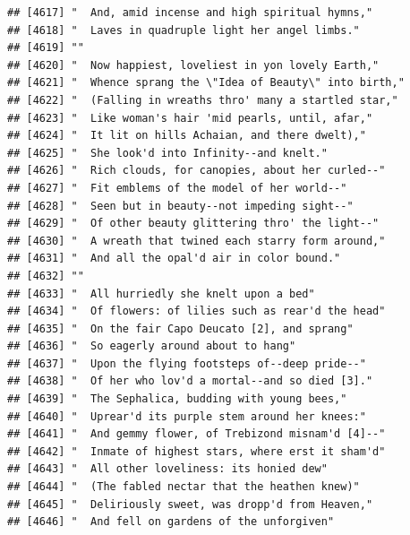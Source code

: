 \documentclass{article}\usepackage[]{graphicx}\usepackage[]{color}
\makeatletter
\newenvironment{kframe}{%
 \def\at@end@of@kframe{}%
 \ifinner\ifhmode%
  \def\at@end@of@kframe{\end{minipage}}%
  \begin{minipage}{\columnwidth}%
 \fi\fi%
 \def\FrameCommand##1{\hskip\@totalleftmargin \hskip-\fboxsep
 \colorbox{shadecolor}{##1}\hskip-\fboxsep
     \hskip-\linewidth \hskip-\@totalleftmargin \hskip\columnwidth}%
 \MakeFramed {\advance\hsize-\width
   \@totalleftmargin\z@ \linewidth\hsize
   \@setminipage}}%
 {\par\unskip\endMakeFramed%
 \at@end@of@kframe}
\newenvironment{knitrout}{}{} %
\makeatother
\begin{document}
\begin{knitrout}
\begin{kframe}
\begin{verbatim}
## [4617] "  And, amid incense and high spiritual hymns,"                               
## [4618] "  Laves in quadruple light her angel limbs."                                 
## [4619] ""                                                                            
## [4620] "  Now happiest, loveliest in yon lovely Earth,"                              
## [4621] "  Whence sprang the \"Idea of Beauty\" into birth,"                          
## [4622] "  (Falling in wreaths thro' many a startled star,"                           
## [4623] "  Like woman's hair 'mid pearls, until, afar,"                               
## [4624] "  It lit on hills Achaian, and there dwelt),"                                
## [4625] "  She look'd into Infinity--and knelt."                                      
## [4626] "  Rich clouds, for canopies, about her curled--"                             
## [4627] "  Fit emblems of the model of her world--"                                   
## [4628] "  Seen but in beauty--not impeding sight--"                                  
## [4629] "  Of other beauty glittering thro' the light--"                              
## [4630] "  A wreath that twined each starry form around,"                             
## [4631] "  And all the opal'd air in color bound."                                    
## [4632] ""                                                                            
## [4633] "  All hurriedly she knelt upon a bed"                                        
## [4634] "  Of flowers: of lilies such as rear'd the head"                             
## [4635] "  On the fair Capo Deucato [2], and sprang"                                  
## [4636] "  So eagerly around about to hang"                                           
## [4637] "  Upon the flying footsteps of--deep pride--"                                
## [4638] "  Of her who lov'd a mortal--and so died [3]."                               
## [4639] "  The Sephalica, budding with young bees,"                                   
## [4640] "  Uprear'd its purple stem around her knees:"                                
## [4641] "  And gemmy flower, of Trebizond misnam'd [4]--"                             
## [4642] "  Inmate of highest stars, where erst it sham'd"                             
## [4643] "  All other loveliness: its honied dew"                                      
## [4644] "  (The fabled nectar that the heathen knew)"                                 
## [4645] "  Deliriously sweet, was dropp'd from Heaven,"                               
## [4646] "  And fell on gardens of the unforgiven"                                     

\end{verbatim}
\end{kframe}
\end{knitrout}
\end{document}
